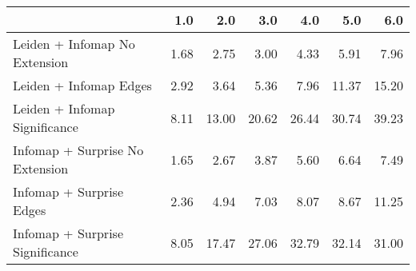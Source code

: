 \begin{tabular}{lrrrrrr}
\toprule
{} &  1.0 &   2.0 &   3.0 &   4.0 &   5.0 &   6.0 \\
\midrule
Leiden + Infomap No Extension   & 1.68 &  2.75 &  3.00 &  4.33 &  5.91 &  7.96 \\
Leiden + Infomap Edges          & 2.92 &  3.64 &  5.36 &  7.96 & 11.37 & 15.20 \\
Leiden + Infomap Significance   & 8.11 & 13.00 & 20.62 & 26.44 & 30.74 & 39.23 \\
Infomap + Surprise No Extension & 1.65 &  2.67 &  3.87 &  5.60 &  6.64 &  7.49 \\
Infomap + Surprise Edges        & 2.36 &  4.94 &  7.03 &  8.07 &  8.67 & 11.25 \\
Infomap + Surprise Significance & 8.05 & 17.47 & 27.06 & 32.79 & 32.14 & 31.00 \\
\bottomrule
\end{tabular}
